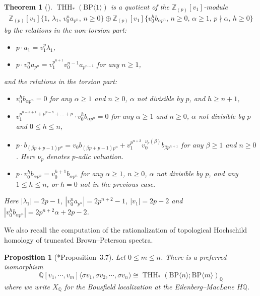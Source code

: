\documentclass[11pt]{amsart}
\newcommand{\mr}[1]{\mathrm{#1}}
\newcommand{\Z}{\mathbb{Z}}
\newcommand{\BP}{\mr{BP}}
\DeclareMathOperator{\THH}{THH}
\newtheorem{theorem}[equation]{Theorem}
\newtheorem{proposition}[equation]{Proposition}
\theoremstyle{definition}
\numberwithin{equation}{section}
\numberwithin{figure}{section}
\begin{document}
\begin{theorem}[{\cite[Sections 6.2--6.3]{AHL10}}]\label{thm:AHL}
  $\THH_*(\BP \langle 1 \rangle)$ is a quotient of the $\Z_{(p)}[v_1]$-module
  \begin{multline}
    \Z_{(p)}[v_1]\{1,\, \lambda_1,\, v_0^n a_{p^n},\,n\geq 0\} 
    \oplus \Z_{(p)}[v_1]\{v_0^h b_{\alpha p^n},\, n\geq 0,\, \alpha\geq 1,\, p\nmid \alpha,\, h \geq 0\}
  \end{multline}
  by the relations in the non-torsion part:
  \begin{itemize}
  \item $p\cdot a_1 = v_1^p \lambda_1$,
  \item $p\cdot v_0^n a_{p^n} = v_1^{p^{n+1}}v_0^{n-1} a_{p^{n-1}}$ for any $n\geq 1$,
  \end{itemize}
  and the relations in the torsion part:
  \begin{itemize}
  \item $v_0^{h} b_{\alpha p^n} = 0$ for any $\alpha \geq 1$ and $n \geq 0$, $\alpha$ not divisible by $p$, and $h \geq n + 1$,
  \item $v_1^{p^{n-h+1}+p^{n-h}+\dots+p }\cdot v_0^h b_{\alpha p^n} = 0$ for any $\alpha \geq 1$ and $n \geq 0$, $\alpha$ not divisible by $p$ and  $0 \leq h \leq n$,
  \item $p\cdot b_{(\beta p+p-1)p^n} = v_0 b_{(\beta p+p-1)p^n}+v_1^{p^{n+2}}v_0^{\nu_p(\beta)} b_{\beta p^{n+1}}$ for any $\beta \geq 1$ and $n \geq 0$. Here $\nu_p$ denotes $p$-adic valuation.
  \item $p\cdot v_0^h b_{\alpha p^n} = v_0^{h+1} b_{\alpha p^n}$ for any $\alpha \geq 1$, $n \geq 0$, $\alpha$ not divisible by $p$, and any $1 \leq h \leq n$, or $h=0$ not in the previous case.
  \end{itemize}
Here $|\lambda_1|=2p-1$, $|v_0^na_{p^n}|=2p^{n+2}-1$, $|v_1|=2p-2$ and $|v_0^hb_{\alpha p^n}|=2p^{n+2}\alpha+2p-2$.
\end{theorem}

We also recall the computation of the rationalization of topological Hochschild homology of truncated Brown--Peterson spectra. 

\begin{proposition}[{\cite{ACH24}*{Proposition~3.7}}]\label{prop:rational}
Let $0\le m\le n$. There is a preferred isomorphism 
\[ 
\mathbb{Q}[v_1,\cdots ,v_m]\langle\sigma v_1,\sigma v_2,\cdots ,\sigma v_n) \cong \THH_*(\BP\langle n\rangle ; \BP\langle m\rangle)_{\mathbb{Q}} 
\]
where we write $X_{\mathbb{Q}}$ for the Bousfield localization at the Eilenberg--MacLane $H\mathbb{Q}$. 
\end{proposition}
\end{document}
